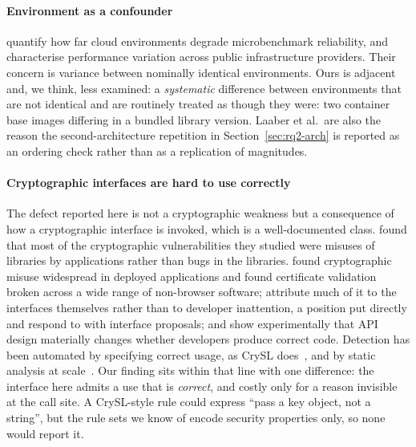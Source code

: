 \documentclass[preprint,12pt,authoryear]{elsarticle}
\begin{document}
\paragraph{Environment as a confounder} \citet{laaber2019cloud}
quantify how far cloud environments degrade microbenchmark reliability, and
\citet{leitner2016patterns} characterise performance variation
across public infrastructure providers. Their concern is variance between
nominally identical environments. Ours is adjacent and, we think, less
examined: a \emph{systematic} difference between environments that are not
identical and are routinely treated as though they were: two container base
images differing in a bundled library version. Laaber et al.\ are also the
reason the second-architecture repetition in Section~\ref{sec:rq2-arch} is
reported as an ordering check rather than as a replication of magnitudes.

\paragraph{Cryptographic interfaces are hard to use correctly} The defect
reported here is not a cryptographic weakness but a consequence of how a
cryptographic interface is invoked, which is a well-documented class. \citet{lazar2014why} found that most of the cryptographic vulnerabilities
they studied were misuses of libraries by applications rather than bugs in the
libraries. \citet{egele2013empirical} found cryptographic misuse
widespread in deployed applications and \citet{georgiev2012dangerous} found certificate validation broken across a
wide range of non-browser software; \citet{nadi2016jumping}
attribute much of it to the interfaces themselves rather than to developer
inattention, a position \citet{green2016developers} put directly
and \citet{indela2016helping} respond to with interface proposals;
and \citet{acar2017comparing} show experimentally that API design
materially changes whether developers produce correct code. Detection has been
automated by specifying correct usage, as CrySL does~\citep{kruger2018crysl},
and by static analysis at scale~\citep{rahaman2019cryptoguard}. Our finding sits
within that line with one difference: the interface here admits a use that is
\emph{correct}, and costly only for a reason invisible at the call site. A
CrySL-style rule could express ``pass a key object, not a string'', but the
rule sets we know of encode security properties only, so none would report it.
\end{document}
